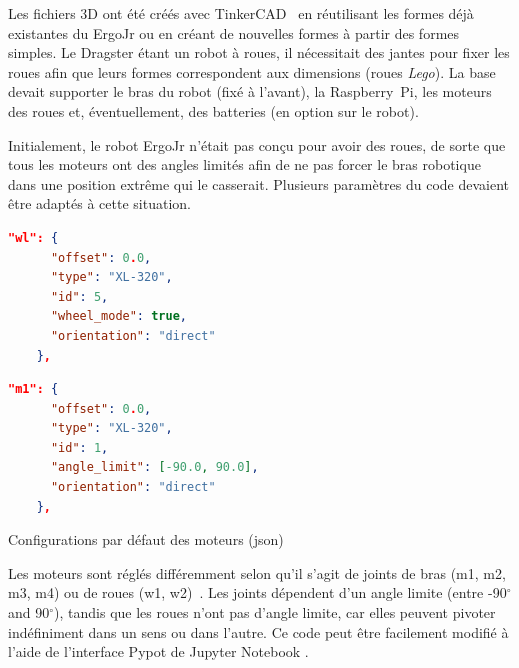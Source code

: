             Les fichiers 3D  ont été créés avec TinkerCAD~ en réutilisant les formes déjà existantes du ErgoJr ou en créant de nouvelles formes à partir des formes simples. Le Dragster étant un robot à roues, il nécessitait des jantes pour fixer les roues afin que leurs formes correspondent aux dimensions (roues \textit{Lego}). La base devait supporter le bras du robot (fixé à l'avant), la Raspberry~Pi, les moteurs des roues et, éventuellement, des batteries (en option sur le robot).\par%
            Initialement, le robot ErgoJr n’était pas conçu pour avoir des roues, de sorte que tous les moteurs ont des angles limités afin de ne pas forcer le bras robotique dans une position extrême qui le casserait. Plusieurs paramètres du code devaient être adaptés à cette situation.
            \begin{code}
                \begin{minipage}{0.425\linewidth}
                    \begin{lstlisting}[language=json,basicstyle=\small]
"wl": {
      "offset": 0.0,
      "type": "XL-320",
      "id": 5,
      "wheel_mode": true,
      "orientation": "direct"
    },
                    \end{lstlisting}
                \end{minipage}
                \begin{minipage}{0.55\linewidth}
                    \begin{lstlisting}[language=json,basicstyle=\small]
"m1": {
      "offset": 0.0,
      "type": "XL-320",
      "id": 1,
      "angle_limit": [-90.0, 90.0],
      "orientation": "direct"
    },
                    \end{lstlisting}
                \end{minipage}
                \caption{\label{cod:mot_conf}Configurations par défaut des moteurs (json)}
            \end{code}\par%
            Les moteurs sont réglés différemment selon qu'il s'agit de joints de bras (m1, m2, m3, m4) ou de roues (w1, w2)~. Les joints dépendent d'un angle limite (entre  -90$^{\circ}$ and 90$^{\circ}$), tandis que les roues n'ont pas d'angle limite, car elles peuvent pivoter indéfiniment dans un sens ou dans l'autre. Ce code peut être facilement modifié à l’aide de l’interface Pypot de Jupyter Notebook .\par%
